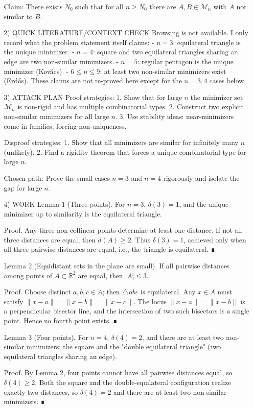 Claim: There exists $N_0$ such that for all $n\ge N_0$ there are $A,B\in\mathcal{M}_n$ with $A$ not similar to $B$.

2) QUICK LITERATURE/CONTEXT CHECK
Browsing is not available. I only record what the problem statement itself claims:
- $n=3$: equilateral triangle is the unique minimizer.
- $n=4$: square and two equilateral triangles sharing an edge are two non-similar minimizers.
- $n=5$: regular pentagon is the unique minimizer (Kov\'acs).
- $6\le n\le 9$: at least two non-similar minimizers exist (Erd\H{o}s).
These claims are not re-proved here except for the $n=3,4$ cases below.

3) ATTACK PLAN
Proof strategies:
1. Show that for large $n$ the minimizer set $\mathcal{M}_n$ is non-rigid and has multiple
   combinatorial types.
2. Construct two explicit non-similar minimizers for all large $n$.
3. Use stability ideas: near-minimizers come in families, forcing non-uniqueness.

Disproof strategies:
1. Show that all minimizers are similar for infinitely many $n$ (unlikely).
2. Find a rigidity theorem that forces a unique combinatorial type for large $n$.

Chosen path: Prove the small cases $n=3$ and $n=4$ rigorously and isolate the gap for large $n$.

4) WORK
Lemma 1 (Three points).
For $n=3$, $\delta(3)=1$, and the unique minimizer up to similarity is the equilateral triangle.

Proof.
Any three non-collinear points determine at least one distance. If not all three distances are
 equal, then $d(A)\ge 2$. Thus $\delta(3)=1$, achieved only when all three pairwise distances are
 equal, i.e., the triangle is equilateral. ∎

Lemma 2 (Equidistant sets in the plane are small).
If all pairwise distances among points of $A\subset\mathbb{R}^2$ are equal, then $|A|\le 3$.

Proof.
Choose distinct $a,b,c\in A$; then $\triangle abc$ is equilateral. Any $x\in A$ must satisfy
$\|x-a\|=\|x-b\|=\|x-c\|$. The locus $\|x-a\|=\|x-b\|$ is a perpendicular bisector line, and the
 intersection of two such bisectors is a single point. Hence no fourth point exists. ∎

Lemma 3 (Four points).
For $n=4$, $\delta(4)=2$, and there are at least two non-similar minimizers: the square and the
"double equilateral triangle" (two equilateral triangles sharing an edge).

Proof.
By Lemma 2, four points cannot have all pairwise distances equal, so $\delta(4)\ge 2$.
Both the square and the double-equilateral configuration realize exactly two distances, so
$\delta(4)=2$ and there are at least two non-similar minimizers. ∎

